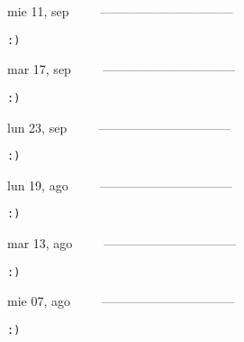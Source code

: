 \documentclass[letterpaper,10pt]{article}
\begin{document}
\begin{multicols}{3}
{mie 11, sep\ \ \ \ \ --------------------------------}
\begin{flushright}\begin{small}\texttt{:)}\end{small}\end{flushright}
\vfill
{mar 17, sep\ \ \ \ \ --------------------------------}
\begin{flushright}\begin{small}\texttt{:)}\end{small}\end{flushright}\par
\vfill
{lun 23, sep\ \ \ \ \ --------------------------------}
\begin{flushright}\begin{small}\texttt{:)}\end{small}\end{flushright}\par
\vfill
\end{multicols}
\vspace{1.05cm}

\begin{multicols}{3}
{lun 19, ago\ \ \ \ \ --------------------------------}
\begin{flushright}\begin{small}\texttt{:)}\end{small}\end{flushright}
\vfill
{mar 13, ago\ \ \ \ \ --------------------------------}
\begin{flushright}\begin{small}\texttt{:)}\end{small}\end{flushright}\par
\vfill
{mie 07, ago\ \ \ \ \ --------------------------------}
\begin{flushright}\begin{small}\texttt{:)}\end{small}\end{flushright}\par
\vfill
\end{multicols}
\vspace{1.05cm}
\end{document}
